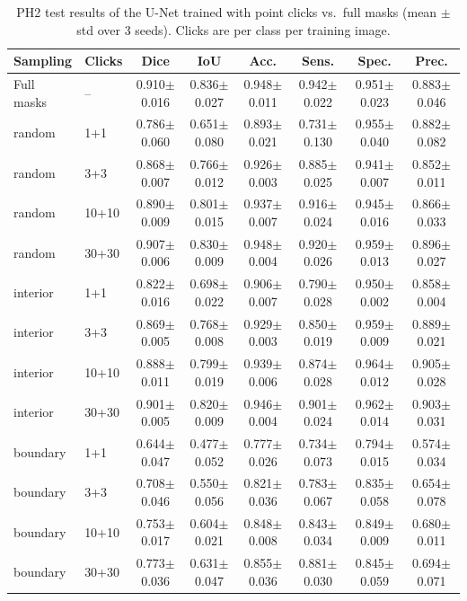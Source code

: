 \begin{table}[t]
\centering\small
\begin{tabular}{llcccccc}
\toprule
Sampling & Clicks & Dice & IoU & Acc. & Sens. & Spec. & Prec. \\ \midrule
Full masks & -- & 0.910$\pm$0.016 & 0.836$\pm$0.027 & 0.948$\pm$0.011 & 0.942$\pm$0.022 & 0.951$\pm$0.023 & 0.883$\pm$0.046 \\ \midrule
random & 1+1 & 0.786$\pm$0.060 & 0.651$\pm$0.080 & 0.893$\pm$0.021 & 0.731$\pm$0.130 & 0.955$\pm$0.040 & 0.882$\pm$0.082 \\
random & 3+3 & 0.868$\pm$0.007 & 0.766$\pm$0.012 & 0.926$\pm$0.003 & 0.885$\pm$0.025 & 0.941$\pm$0.007 & 0.852$\pm$0.011 \\
random & 10+10 & 0.890$\pm$0.009 & 0.801$\pm$0.015 & 0.937$\pm$0.007 & 0.916$\pm$0.024 & 0.945$\pm$0.016 & 0.866$\pm$0.033 \\
random & 30+30 & 0.907$\pm$0.006 & 0.830$\pm$0.009 & 0.948$\pm$0.004 & 0.920$\pm$0.026 & 0.959$\pm$0.013 & 0.896$\pm$0.027 \\ \midrule
interior & 1+1 & 0.822$\pm$0.016 & 0.698$\pm$0.022 & 0.906$\pm$0.007 & 0.790$\pm$0.028 & 0.950$\pm$0.002 & 0.858$\pm$0.004 \\
interior & 3+3 & 0.869$\pm$0.005 & 0.768$\pm$0.008 & 0.929$\pm$0.003 & 0.850$\pm$0.019 & 0.959$\pm$0.009 & 0.889$\pm$0.021 \\
interior & 10+10 & 0.888$\pm$0.011 & 0.799$\pm$0.019 & 0.939$\pm$0.006 & 0.874$\pm$0.028 & 0.964$\pm$0.012 & 0.905$\pm$0.028 \\
interior & 30+30 & 0.901$\pm$0.005 & 0.820$\pm$0.009 & 0.946$\pm$0.004 & 0.901$\pm$0.024 & 0.962$\pm$0.014 & 0.903$\pm$0.031 \\ \midrule
boundary & 1+1 & 0.644$\pm$0.047 & 0.477$\pm$0.052 & 0.777$\pm$0.026 & 0.734$\pm$0.073 & 0.794$\pm$0.015 & 0.574$\pm$0.034 \\
boundary & 3+3 & 0.708$\pm$0.046 & 0.550$\pm$0.056 & 0.821$\pm$0.036 & 0.783$\pm$0.067 & 0.835$\pm$0.058 & 0.654$\pm$0.078 \\
boundary & 10+10 & 0.753$\pm$0.017 & 0.604$\pm$0.021 & 0.848$\pm$0.008 & 0.843$\pm$0.034 & 0.849$\pm$0.009 & 0.680$\pm$0.011 \\
boundary & 30+30 & 0.773$\pm$0.036 & 0.631$\pm$0.047 & 0.855$\pm$0.036 & 0.881$\pm$0.030 & 0.845$\pm$0.059 & 0.694$\pm$0.071 \\
\bottomrule
\end{tabular}
\caption{PH2 test results of the U-Net trained with point clicks vs.\ full masks (mean $\pm$ std over 3 seeds). Clicks are per class per training image.}
\label{tab:clicks_test}
\end{table}
